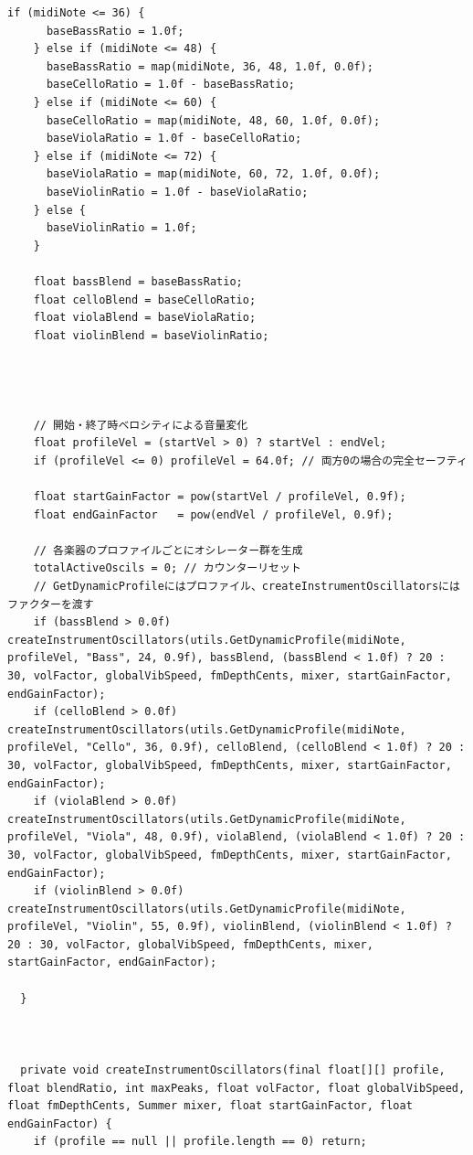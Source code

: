 \begin{lstlisting}[caption={Strings.pde}, label={lst:proc_strings}]
    if (midiNote <= 36) {
      baseBassRatio = 1.0f;
    } else if (midiNote <= 48) {
      baseBassRatio = map(midiNote, 36, 48, 1.0f, 0.0f);
      baseCelloRatio = 1.0f - baseBassRatio;
    } else if (midiNote <= 60) {
      baseCelloRatio = map(midiNote, 48, 60, 1.0f, 0.0f);
      baseViolaRatio = 1.0f - baseCelloRatio;
    } else if (midiNote <= 72) {
      baseViolaRatio = map(midiNote, 60, 72, 1.0f, 0.0f);
      baseViolinRatio = 1.0f - baseViolaRatio;
    } else {
      baseViolinRatio = 1.0f;
    }
    
    float bassBlend = baseBassRatio;
    float celloBlend = baseCelloRatio;
    float violaBlend = baseViolaRatio;
    float violinBlend = baseViolinRatio;
    
    
    
    
    // 開始・終了時ベロシティによる音量変化
    float profileVel = (startVel > 0) ? startVel : endVel;
    if (profileVel <= 0) profileVel = 64.0f; // 両方0の場合の完全セーフティ
    
    float startGainFactor = pow(startVel / profileVel, 0.9f);
    float endGainFactor   = pow(endVel / profileVel, 0.9f);
    
    // 各楽器のプロファイルごとにオシレーター群を生成
    totalActiveOscils = 0; // カウンターリセット
    // GetDynamicProfileにはプロファイル、createInstrumentOscillatorsにはファクターを渡す
    if (bassBlend > 0.0f) createInstrumentOscillators(utils.GetDynamicProfile(midiNote, profileVel, "Bass", 24, 0.9f), bassBlend, (bassBlend < 1.0f) ? 20 : 30, volFactor, globalVibSpeed, fmDepthCents, mixer, startGainFactor, endGainFactor);
    if (celloBlend > 0.0f) createInstrumentOscillators(utils.GetDynamicProfile(midiNote, profileVel, "Cello", 36, 0.9f), celloBlend, (celloBlend < 1.0f) ? 20 : 30, volFactor, globalVibSpeed, fmDepthCents, mixer, startGainFactor, endGainFactor);
    if (violaBlend > 0.0f) createInstrumentOscillators(utils.GetDynamicProfile(midiNote, profileVel, "Viola", 48, 0.9f), violaBlend, (violaBlend < 1.0f) ? 20 : 30, volFactor, globalVibSpeed, fmDepthCents, mixer, startGainFactor, endGainFactor);
    if (violinBlend > 0.0f) createInstrumentOscillators(utils.GetDynamicProfile(midiNote, profileVel, "Violin", 55, 0.9f), violinBlend, (violinBlend < 1.0f) ? 20 : 30, volFactor, globalVibSpeed, fmDepthCents, mixer, startGainFactor, endGainFactor);
    
  }
  
  
  
  private void createInstrumentOscillators(final float[][] profile, float blendRatio, int maxPeaks, float volFactor, float globalVibSpeed, float fmDepthCents, Summer mixer, float startGainFactor, float endGainFactor) {
    if (profile == null || profile.length == 0) return;
    

\end{lstlisting}
